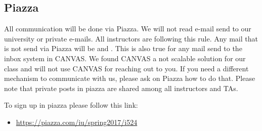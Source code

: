 
\subsection{Piazza}
\label{\detokenize{i524/index:index-6}}\label{\detokenize{i524/index:piazza}}
All communication will be done via Piazza. We will not read e-mail
send to our university or private e-mails. All instructors are
following this rule. Any mail that is not send via Piazza will be
 and . This is also true for any mail send to
the inbox system in CANVAS. We found CANVAS a not scalable solution
for our class and will not use CANVAS for reaching out to you.   If you
need a different mechanism to communicate with us, please ask on Piazza
how to do that. Please note that private posts in piazza are shared
among all instructors and TAs.

To sign up in piazza please follow this link:
\begin{itemize}
\item {} 
\url{https://piazza.com/iu/spring2017/i524}

\end{itemize}

